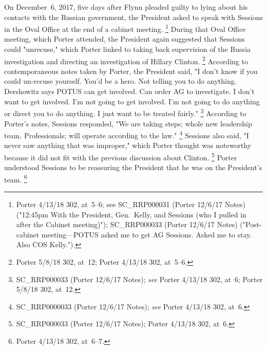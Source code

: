 On December~6, 2017, five days after Flynn pleaded guilty to lying about his contacts with the Russian government, the President asked to speak with Sessions in the Oval Office at the end of a cabinet meeting.%
\footnote{Porter 4/13/18 302, at~5--6;
see SC\_RRP000031 (Porter 12/6/17 Notes) ("12:45pm With the President, Gen.~Kelly, and Sessions (who I pulled in after the Cabinet meeting)");
SC\_RRP000033 (Porter 12/6/17 Notes) ("Post-cabinet meeting---POTUS asked me to get AG Sessions.
Asked me to stay.
Also COS Kelly.").}
During that Oval Office meeting, which Porter attended, the President again suggested that Sessions could "unrecuse," which Porter linked to taking back supervision of the Russia investigation and directing an investigation of Hillary Clinton.%
\footnote{Porter 5/8/18 302, at~12;
Porter 4/13/18 302, at~5--6.}
According to contemporaneous notes taken by Porter, the President said, "I don't know if you could un-recuse yourself.
You'd be a hero.
Not telling you to do anything.
Dershowitz says POTUS can get involved.
Can order AG to investigate.
I don't want to get involved.
I'm not going to get involved.
I'm not going to do anything or direct you to do anything.
I just want to be treated fairly."%
\footnote{SC\_RRP000033 (Porter 12/6/17 Notes);
\textit{see} Porter 4/13/18 302, at~6;
Porter 5/8/18 302, at~12.}
According to Porter's notes, Sessions responded, "We are taking steps; whole new leadership team.
Professionals; will operate according to the law."%
\footnote{SC\_RRP0000033 (Porter 12/6/17 Notes);
\textit{see} Porter 4/13/18 302, at~6.}
Sessions also said, "I never saw anything that was improper," which Porter thought was noteworthy because it did not fit with the previous discussion about Clinton.%
\footnote{SC\_RRP000033 (Porter 12/6/17 Notes);
Porter 4/13/18 302, at~6.}
Porter understood Sessions to be reassuring the President that he was on the President's team.%
\footnote{Porter 4/13/18 302, at~6--7.}

